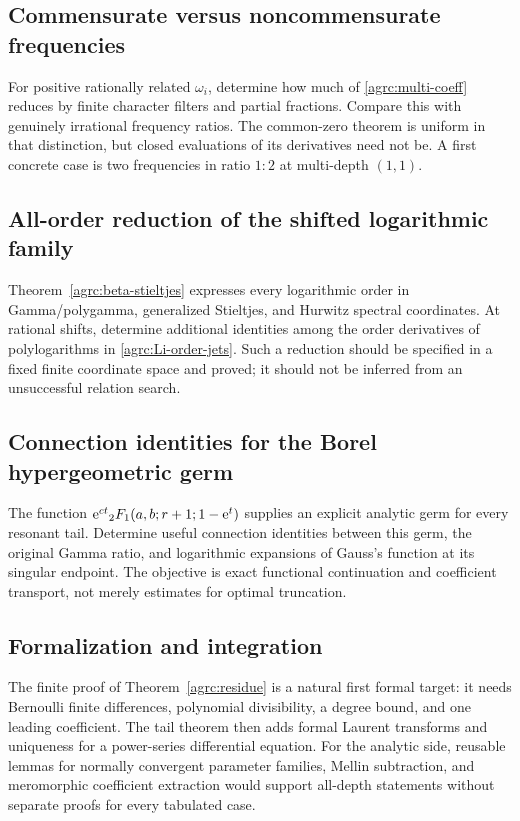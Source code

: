 \subsection{Commensurate versus noncommensurate frequencies}
For positive rationally related $\omega_i$, determine how much of
\eqref{agrc:multi-coeff} reduces by finite character filters and
partial fractions. Compare this with genuinely irrational frequency
ratios. The common-zero theorem is uniform in that distinction, but
closed evaluations of its derivatives need not be. A first concrete
case is two frequencies in ratio $1:2$ at multi-depth $(1,1)$.

\subsection{All-order reduction of the shifted logarithmic family}
Theorem~\ref{agrc:beta-stieltjes} expresses every logarithmic order in
Gamma/polygamma, generalized Stieltjes, and Hurwitz spectral coordinates.
At rational shifts, determine additional identities among the order
 derivatives of polylogarithms in \eqref{agrc:Li-order-jets}. Such a
reduction should be specified in a fixed finite coordinate space and
proved; it should not be inferred from an unsuccessful relation search.

\subsection{Connection identities for the Borel hypergeometric germ}
The function $\mathrm e^{ct}{}_2F_1(a,b;r+1;1-\mathrm e^t)$ supplies an explicit analytic
germ for every resonant tail. Determine useful connection identities
between this germ, the original Gamma ratio, and logarithmic expansions
of Gauss's function at its singular endpoint. The objective is exact
functional continuation and coefficient transport, not merely estimates
for optimal truncation.

\subsection{Formalization and integration}
The finite proof of Theorem~\ref{agrc:residue} is a natural first formal
 target: it needs Bernoulli finite differences, polynomial divisibility,
a degree bound, and one leading coefficient. The tail theorem then adds
formal Laurent transforms and uniqueness for a power-series differential
equation. For the analytic side, reusable lemmas for normally convergent
parameter families, Mellin subtraction, and meromorphic coefficient
extraction would support all-depth statements without separate proofs
for every tabulated case.

